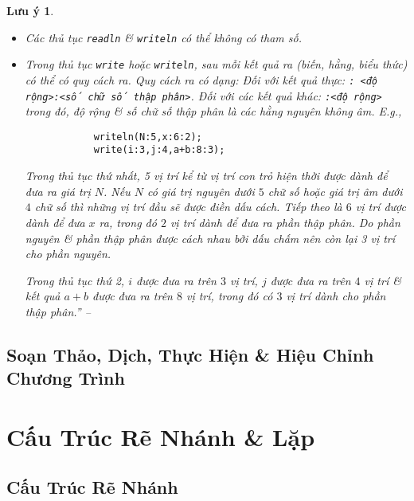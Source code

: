 \documentclass[oneside]{book}
\numberwithin{equation}{section}
\newtheorem{luuy}{Lưu ý}[section]
\begin{document}
\begin{luuy}
	\begin{itemize}
		\item Các thủ tục \texttt{readln} \& \texttt{writeln} có thể không có tham số.
		\item Trong thủ tục \texttt{write} hoặc \texttt{writeln}, sau mỗi kết quả ra (biến, hằng, biểu thức) có thể có \emph{quy cách ra}. Quy cách ra có dạng: Đối với kết quả thực: \verb|: <độ rộng>:<số chữ số thập phân>|. Đối với các kết quả khác: \verb|:<độ rộng>| trong đó, \emph{độ rộng} \& \emph{số chữ số thập phân} là các hằng nguyên không âm. E.g.,
		\begin{verbatim}
			writeln(N:5,x:6:2);
			write(i:3,j:4,a+b:8:3);
		\end{verbatim}
		Trong thủ tục thứ nhất, 5 vị trí kể từ vị trí con trỏ hiện thời được dành để đưa ra giá trị $N$. Nếu $N$ có giá trị nguyên dưới $5$ chữ số hoặc giá trị âm dưới $4$ chữ số thì những vị trí đầu sẽ được điền dấu cách. Tiếp theo là $6$ vị trí được dành để đưa $x$ ra, trong đó $2$ vị trí dành để đưa ra phần thập phân. Do phần nguyên \& phần thập phân được cách nhau bởi dấu chấm nên còn lại 3 vị trí cho phần nguyên.
		
		Trong thủ tục thứ 2, $i$ được đưa ra trên $3$ vị trí, $j$ được đưa ra trên $4$ vị trí \& kết quả $a + b$ được đưa ra trên $8$ vị trí, trong đó có $3$ vị trí dành cho phần thập phân.'' -- \cite[p. 31]{SGK_Tin_Hoc_11}
	\end{itemize}
\end{luuy}


\section{Soạn Thảo, Dịch, Thực Hiện \& Hiệu Chỉnh Chương Trình}


\chapter{Cấu Trúc Rẽ Nhánh \& Lặp}

\section{Cấu Trúc Rẽ Nhánh}

\end{document}
